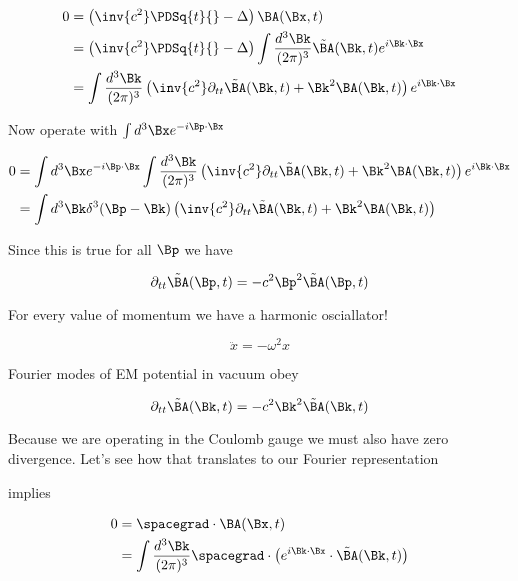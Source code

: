 \begin{align*}
0 &= 
\left( \inv{c^2} \PDSq{t}{} - \Delta \right) \BA(\Bx, t) \\
&=
\left( \inv{c^2} \PDSq{t}{} - \Delta \right) 
\int 
\frac{d^3 \Bk}{(2\pi)^3} 
\tilde{\BA}(\Bk, t) e^{i \Bk \cdot \Bx} \\
&=
\int 
\frac{d^3 \Bk}{(2\pi)^3} 
\left( 
\inv{c^2} \partial_{tt} \tilde{\BA}(\Bk, t) + \Bk^2 \BA(\Bk, t)
\right)
e^{i \Bk \cdot \Bx} 
\end{align*}

Now operate with $\int d^3 \Bx e^{-i \Bp \cdot \Bx }$

\begin{align*}
0 &=
\int d^3 \Bx e^{-i \Bp \cdot \Bx }
\int 
\frac{d^3 \Bk}{(2\pi)^3} 
\left( 
\inv{c^2} \partial_{tt} \tilde{\BA}(\Bk, t) + \Bk^2 \BA(\Bk, t)
\right)
e^{i \Bk \cdot \Bx}  \\
&=
\int 
d^3 \Bk
\delta^3(\Bp -\Bk) 
\left( 
\inv{c^2} \partial_{tt} \tilde{\BA}(\Bk, t) + \Bk^2 \BA(\Bk, t)
\right)
\end{align*}

Since this is true for all $\Bp$ we have

\begin{equation}\label{eqn:relativisticElectrodynamicsL15:490}
\partial_{tt} \tilde{\BA}(\Bp, t) = -c^2 \Bp^2 \tilde{\BA}(\Bp, t) 
\end{equation}

For every value of momentum we have a harmonic osciallator!

\begin{equation}\label{eqn:relativisticElectrodynamicsL15:510}
\ddot{x} = -\omega^2 x
\end{equation}

Fourier modes of EM potential in vacuum obey

\begin{equation}\label{eqn:relativisticElectrodynamicsL15:530}
\partial_{tt} \tilde{\BA}(\Bk, t) = -c^2 \Bk^2 \tilde{\BA}(\Bk, t)
\end{equation}

Because we are operating in the Coulomb gauge we must also have zero divergence.  Let's see how that translates to our Fourier representation


implies

\begin{align*}
0 &= \spacegrad \cdot \BA(\Bx, t) \\
&= \int \frac{d^3 \Bk }{(2 \pi)^3} \spacegrad \cdot \left( e^{i \Bk \cdot \Bx} \cdot \tilde{\BA}(\Bk, t) \right)
\end{align*}


